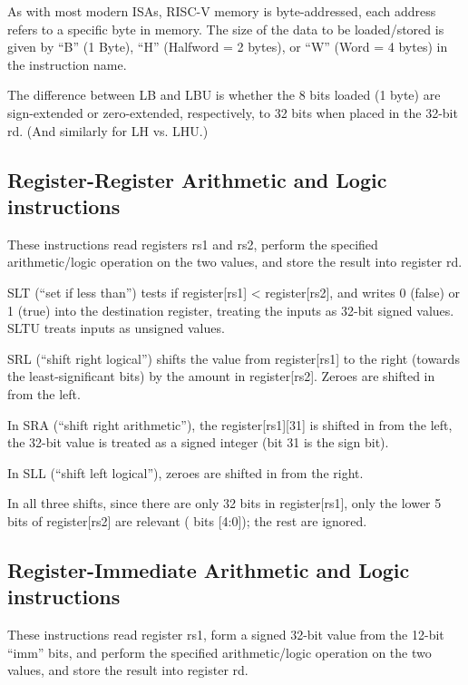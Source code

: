 As with most modern ISAs, RISC-V memory is byte-addressed, {\ie} each
address refers to a specific byte in memory.  The size of the data to
be loaded/stored is given by ``B'' (1 Byte), ``H'' (Halfword = 2
bytes), or ``W'' (Word = 4 bytes) in the instruction name.

The difference between LB and LBU is whether the 8 bits loaded (1
byte) are sign-extended or zero-extended, respectively, to 32 bits
when placed in the 32-bit rd. (And similarly for LH vs. LHU.)


\subsection{Register-Register Arithmetic and Logic instructions}

These instructions read registers rs1 and rs2, perform the specified
arithmetic/logic operation on the two values, and store the result
into register rd.

SLT (``set if less than'') tests if register[rs1] < register[rs2], and
writes 0 (false) or 1 (true) into the destination register, treating
the inputs as 32-bit signed values.  SLTU treats inputs as unsigned
values.

SRL (``shift right logical'') shifts the value from register[rs1] to
the right (towards the least-significant bits) by the amount in
register[rs2].  Zeroes are shifted in from the left.

In SRA (``shift right arithmetic''), the register[rs1][31] is shifted
in from the left, {\ie} the 32-bit value is treated as a signed
integer (bit 31 is the sign bit).

In SLL (``shift left logical''), zeroes are shifted in from the right.

In all three shifts, since there are only 32 bits in register[rs1],
only the lower 5 bits of register[rs2] are relevant ({\ie} bits
[4:0]); the rest are ignored.


\subsection{Register-Immediate Arithmetic and Logic instructions}

\label{sec:SRxI}

These instructions read register rs1, form a signed 32-bit value from
the 12-bit ``imm'' bits, and perform the specified arithmetic/logic
operation on the two values, and store the result into register rd.


